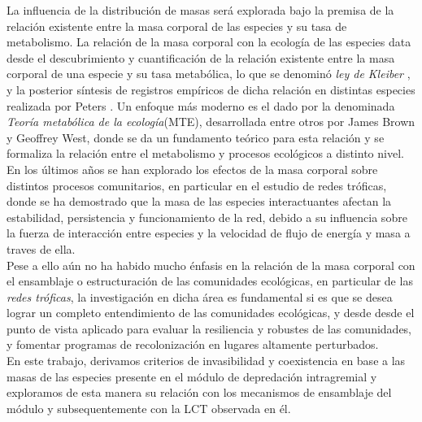 La influencia de la distribuci\'on de masas ser\'a explorada bajo la premisa de la relaci\'on existente entre la masa corporal de las especies y su tasa de metabolismo. La relaci\'on de la masa corporal con la ecolog\'ia de las especies data desde el descubrimiento y cuantificaci\'on de la relaci\'on existente entre la masa corporal de una especie y su tasa metab\'olica, lo que se denomin\'o \emph{ley de Kleiber} \citep{kleiber1961fire}, y la posterior s\'intesis de registros emp\'iricos de dicha relaci\'on en distintas especies realizada por Peters \citep{peters1986ecological}. Un enfoque m\'as moderno es el dado por la denominada \emph{Teor\'ia metab\'olica de la ecolog\'ia}(MTE), desarrollada entre otros por James Brown y Geoffrey West\citep{brown2004toward}, donde se da un fundamento te\'orico para esta relaci\'on\citep{west1997general, savage2004predominance} y se formaliza la relaci\'on entre el metabolismo y procesos ecol\'ogicos a distinto nivel\citep{savage2004effects,brown_metabolic_book}.\\

En los \'ultimos a\~nos se han explorado los efectos de la masa corporal sobre distintos procesos comunitarios, en particular en el estudio de redes tr\'oficas, donde se ha demostrado que la masa de las especies interactuantes afectan la estabilidad, persistencia y funcionamiento de la red, debido a su influencia sobre la fuerza de interacci\'on entre especies y la velocidad de flujo de energ\'ia y masa a traves de ella. \citep{brose2006allometric,mccann2011food}\\

Pese a ello a\'un no ha habido mucho \'enfasis en la relaci\'on de la masa corporal con el ensamblaje o estructuraci\'on de las comunidades ecol\'ogicas, en particular de las \emph{redes tr\'oficas}, la investigaci\'on en dicha \'area es fundamental si es que se desea lograr un completo entendimiento de las comunidades ecol\'ogicas, y desde desde el punto de vista aplicado para evaluar la resiliencia y robustes de las comunidades, y fomentar programas de recolonizaci\'on en lugares altamente perturbados.\\

En este trabajo, derivamos criterios de invasibilidad y coexistencia en base a las masas de las especies presente en el m\'odulo de depredaci\'on intragremial y exploramos de esta manera su relaci\'on con los mecanismos de ensamblaje del m\'odulo y subsequentemente con la LCT observada en \'el.

